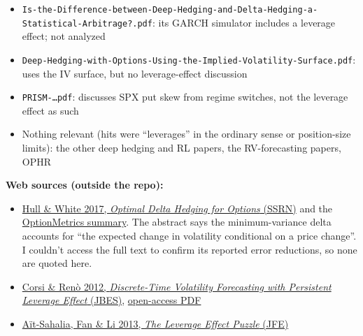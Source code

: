 \documentclass{article}
\begin{document}
\begin{itemize}

\item \texttt{Is-\allowbreak{}the-\allowbreak{}Difference-\allowbreak{}between-\allowbreak{}Deep-\allowbreak{}Hedging-\allowbreak{}and-\allowbreak{}Delta-\allowbreak{}Hedging-\allowbreak{}a-\allowbreak{}Statistical-\allowbreak{}Arbitrage?.\allowbreak{}pdf}: its GARCH simulator includes a leverage effect; not analyzed

\item \texttt{Deep-\allowbreak{}Hedging-\allowbreak{}with-\allowbreak{}Options-\allowbreak{}Using-\allowbreak{}the-\allowbreak{}Implied-\allowbreak{}Volatility-\allowbreak{}Surface.\allowbreak{}pdf}: uses the IV surface, but no leverage-effect discussion

\item \texttt{PRISM-\allowbreak{}\ldots{}pdf}: discusses SPX put skew from regime switches, not the leverage effect as such

\item Nothing relevant (hits were ``leverages'' in the ordinary sense or position-size limits): the other deep hedging and RL papers, the RV-forecasting papers, OPHR

\end{itemize}

\textbf{Web sources (outside the repo):}

\begin{itemize}

\item \href{https://papers.ssrn.com/sol3/papers.cfm?abstract_id=2658343}{Hull \& White 2017, \emph{Optimal Delta Hedging for Options} (SSRN)} and the \href{https://optionmetrics.com/research/hull_white_2017/}{OptionMetrics summary}. The abstract says the minimum-variance delta accounts for ``the expected change in volatility conditional on a price change''. I couldn't access the full text to confirm its reported error reductions, so none are quoted here.

\item \href{https://www.tandfonline.com/doi/full/10.1080/07350015.2012.663261}{Corsi \& Renò 2012, \emph{Discrete-Time Volatility Forecasting with Persistent Leverage Effect} (JBES)}, \href{https://openaccess.city.ac.uk/id/eprint/4434/1/CorsiReno_LHAR_sub2012.pdf}{open-access PDF}

\item \href{https://ideas.repec.org/a/eee/jfinec/v109y2013i1p224-249.html}{Aït-Sahalia, Fan \& Li 2013, \emph{The Leverage Effect Puzzle} (JFE)}

\end{itemize}
\end{document}

